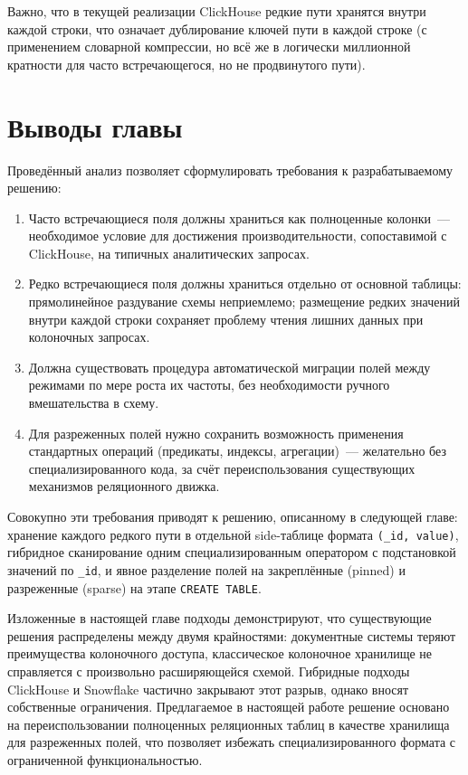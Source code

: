 Важно, что в текущей реализации ClickHouse редкие пути хранятся
внутри каждой строки, что означает дублирование ключей пути в
каждой строке (с применением словарной компрессии, но всё же в
логически миллионной кратности для часто встречающегося, но не
продвинутого пути).

\section{Выводы главы}

Проведённый анализ позволяет сформулировать требования к
разрабатываемому решению:
\begin{enumerate}
    \item Часто встречающиеся поля должны храниться как полноценные
    колонки~--- необходимое условие для достижения
    производительности, сопоставимой с ClickHouse, на типичных
    аналитических запросах.
    \item Редко встречающиеся поля должны храниться отдельно от
    основной таблицы: прямолинейное раздувание схемы неприемлемо;
    размещение редких значений внутри каждой строки сохраняет
    проблему чтения лишних данных при колоночных запросах.
    \item Должна существовать процедура автоматической миграции
    полей между режимами по мере роста их частоты, без
    необходимости ручного вмешательства в схему.
    \item Для разреженных полей нужно сохранить возможность
    применения стандартных операций (предикаты, индексы,
    агрегации)~--- желательно без специализированного кода, за
    счёт переиспользования существующих механизмов реляционного
    движка.
\end{enumerate}

Совокупно эти требования приводят к решению, описанному в
следующей главе: хранение каждого редкого пути в отдельной
side-таблице формата \texttt{(\_id, value)}, гибридное сканирование
одним специализированным оператором с подстановкой значений по
\texttt{\_id}, и явное разделение полей на закреплённые (pinned)
и разреженные (sparse) на этапе \texttt{CREATE TABLE}.

\finishrelatedwork

\chapterconclusion

Изложенные в настоящей главе подходы демонстрируют, что
существующие решения распределены между двумя крайностями:
документные системы теряют преимущества колоночного доступа,
классическое колоночное хранилище не справляется с произвольно
расширяющейся схемой. Гибридные подходы ClickHouse и Snowflake
частично закрывают этот разрыв, однако вносят собственные
ограничения. Предлагаемое в настоящей работе решение основано на
переиспользовании полноценных реляционных таблиц в качестве
хранилища для разреженных полей, что позволяет избежать
специализированного формата с ограниченной функциональностью.
